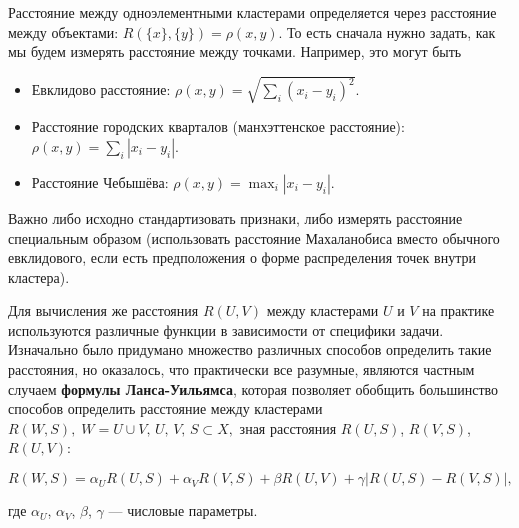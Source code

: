 \documentclass[10pt]{article}
\begin{document}
Расстояние между одноэлементными кластерами определяется через расстояние между объектами: $R(\{x\}, \{y\})= \rho(x,y)$. То есть сначала нужно задать, как мы будем измерять расстояние между точками. Например, это могут быть
\begin{itemize}
	\item Евклидово расстояние: $\rho(x,y) = \sqrt{\sum_i (x_i - y_i)^2}$.
	\item Расстояние городских кварталов (манхэттенское расстояние):  $\rho(x,y) = \sum_i |x_i - y_i|$.
	\item Расстояние Чебышёва: $\rho(x,y) = \max_i |x_i - y_i|$.
\end{itemize}
Важно либо исходно стандартизовать признаки, либо измерять расстояние
специальным образом (использовать расстояние Махаланобиса вместо обычного евклидового, если есть предположения о форме распределения точек внутри кластера).


Для вычисления же расстояния $R(U, V)$ между кластерами $U$ и $V$ на практике используются различные функции в зависимости от специфики задачи.
Изначально было придумано множество различных способов определить такие расстояния, но оказалось, что практически все разумные, являются частным случаем \textbf{формулы Ланса-Уильямса}, которая позволяет обобщить большинство способов определить расстояние между кластерами $ R(W, S),\; W = U \cup V,\, U,\, V,\, S \subset X, $ зная расстояния $R(U, S)$, $R(V, S)$, $R(U, V)$: 
	
	$$ R(W, S) = \alpha_{U} R(U, S) + \alpha_{V} R(V, S) + \beta R(U, V) + \gamma|R(U, S) - R(V, S)|,$$
	
	где $\alpha_{U}$, $\alpha_{V}$, $\beta$, $\gamma$ --- числовые параметры.
	
\end{document}
